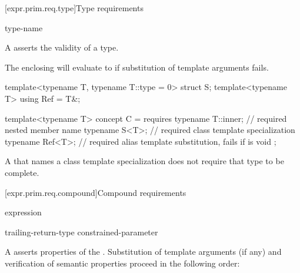 [expr.prim.req.type]{Type requirements}
%

\begin{bnf}
\br
      type-name \terminal{;}
\end{bnf}

\pnum
A  asserts the validity of a type.
\begin{note}
The enclosing  will evaluate to 
if substitution of template arguments fails.
\end{note}
\begin{example}
\begin{codeblock}
template<typename T, typename T::type = 0> struct S;
template<typename T> using Ref = T&;

template<typename T> concept C = requires {
  typename T::inner;    // required nested member name
  typename S<T>;        // required class template specialization
  typename Ref<T>;      // required alias template substitution, fails if  is void
};
\end{codeblock}
\end{example}

\pnum
A  that names a class template specialization
does not require that type to be complete.

[expr.prim.req.compound]{Compound requirements}
%

\begin{bnf}
\br
    \terminal{\{} expression \terminal{\}}   \terminal{;}
\end{bnf}

\begin{bnf}
\br
    trailing-return-type\br
    \terminal{->}  constrained-parameter  
\end{bnf}

\pnum
A  asserts properties
of the  . Substitution
of template arguments (if any) and verification of
semantic properties proceed in the following order:

